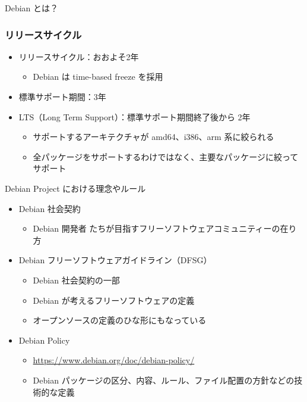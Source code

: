 \begin{frame}{Debian とは？}

\frametitle{リリースサイクル}
\begin{itemize}
\item リリースサイクル：おおよそ2年
  \begin{itemize}
  \item Debian は time-based freeze を採用
  \end{itemize}
\item 標準サポート期間：3年
\item LTS（Long Term Support）：標準サポート期間終了後から 2年
  \begin{itemize}
  \item サポートするアーキテクチャが amd64、i386、arm 系に絞られる
  \item 全パッケージをサポートするわけではなく、主要なパッケージに絞ってサポート
  \end{itemize}
\end{itemize}

\end{frame}


\begin{frame}{Debian Project における理念やルール}

\begin{itemize}
\item Debian 社会契約
  \begin{itemize}
  \item Debian 開発者 たちが目指すフリーソフトウェアコミュニティーの在り方
  \end{itemize}
\item Debian フリーソフトウェアガイドライン（DFSG）
  \begin{itemize}
  \item Debian 社会契約の一部
  \item Debian が考えるフリーソフトウェアの定義
  \item オープンソースの定義のひな形にもなっている
  \end{itemize}
\item Debian Policy
  \begin{itemize}
  \item \url{https://www.debian.org/doc/debian-policy/}
  \item Debian パッケージの区分、内容、ルール、ファイル配置の方針などの技術的な定義
  \end{itemize}
\end{itemize}

\end{frame}


